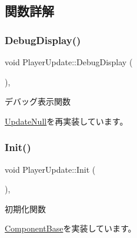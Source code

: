 \subsection{関数詳解}
\mbox{\label{class_player_update_ac15fd0faf356c6e66f6c62c2b6b8d3ac}} 
\subsubsection{\texorpdfstring{Debug\+Display()}{DebugDisplay()}}
{\footnotesize\ttfamily void Player\+Update\+::\+Debug\+Display (\begin{DoxyParamCaption}{ }\end{DoxyParamCaption})\hspace{0.3cm}{\ttfamily [override]}, {\ttfamily [virtual]}}



デバッグ表示関数 



\mbox{\hyperlink{class_update_null_a77aee1e614cf6dafe4f9af58b2205e4b}{Update\+Null}}を再実装しています。

\mbox{\label{class_player_update_ac72b39db7b7bfaf094bde9ed1adef4b7}} 
\subsubsection{\texorpdfstring{Init()}{Init()}}
{\footnotesize\ttfamily void Player\+Update\+::\+Init (\begin{DoxyParamCaption}{ }\end{DoxyParamCaption})\hspace{0.3cm}{\ttfamily [override]}, {\ttfamily [virtual]}}



初期化関数 



\mbox{\hyperlink{class_component_base_a125939d6befe42f28886a6523e86b18b}{Component\+Base}}を実装しています。

\mbox{\label{class_player_update_ae376f517f3458edfef61ac366aa78e36}} 
